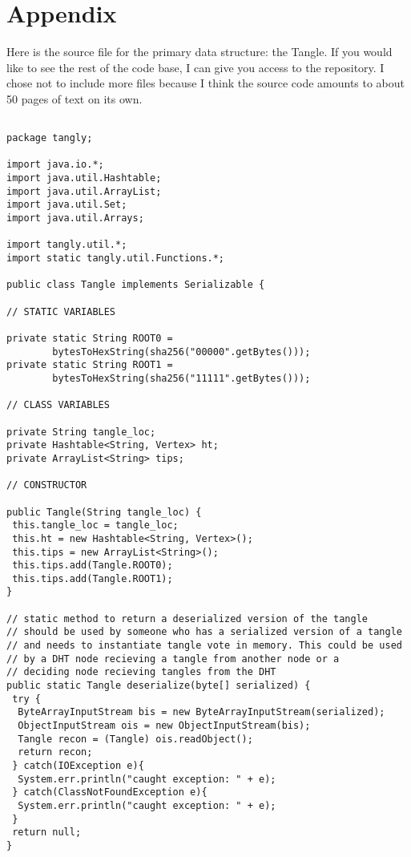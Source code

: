\newpage
\section{Appendix}
\label{sec:appendix}

Here is the source file for the primary data structure: the Tangle.
If you would like to see the rest of the code base, I can give you access to the repository.
I chose not to include more files because I think the source code amounts to about 50 pages of text on its own.

\begin{Verbatim}

package tangly;

import java.io.*;
import java.util.Hashtable;
import java.util.ArrayList;
import java.util.Set;
import java.util.Arrays;

import tangly.util.*;
import static tangly.util.Functions.*;

public class Tangle implements Serializable {

// STATIC VARIABLES

private static String ROOT0 = 
        bytesToHexString(sha256("00000".getBytes()));	
private static String ROOT1 = 
        bytesToHexString(sha256("11111".getBytes()));

// CLASS VARIABLES

private String tangle_loc;
private Hashtable<String, Vertex> ht;
private ArrayList<String> tips;

// CONSTRUCTOR

public Tangle(String tangle_loc) {
 this.tangle_loc = tangle_loc;
 this.ht = new Hashtable<String, Vertex>();		
 this.tips = new ArrayList<String>();	
 this.tips.add(Tangle.ROOT0);
 this.tips.add(Tangle.ROOT1);
}

// static method to return a deserialized version of the tangle
// should be used by someone who has a serialized version of a tangle
// and needs to instantiate tangle vote in memory. This could be used
// by a DHT node recieving a tangle from another node or a 
// deciding node recieving tangles from the DHT
public static Tangle deserialize(byte[] serialized) {
 try {
  ByteArrayInputStream bis = new ByteArrayInputStream(serialized);
  ObjectInputStream ois = new ObjectInputStream(bis);
  Tangle recon = (Tangle) ois.readObject();
  return recon;
 } catch(IOException e){ 
  System.err.println("caught exception: " + e);
 } catch(ClassNotFoundException e){
  System.err.println("caught exception: " + e);
 }
 return null;
}


\end{Verbatim}
